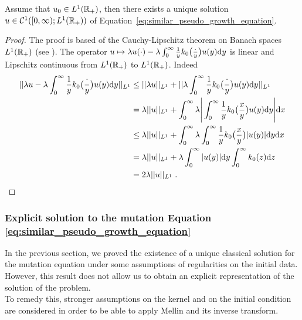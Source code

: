 \documentclass[11pt]{amsart}
\begin{document}
\begin{lemma} Assume that $u_0 \in L^1(\mathbb{R}_+)$, then there exists a unique solution $u \in \mathcal{C}^1([0, \infty); L^1(\mathbb{R}_+))$ of Equation~\eqref{eq:similar_pseudo_growth_equation}.
\end{lemma}
\begin{proof}
The proof is based of the Cauchy-Lipschitz theorem on Banach spaces $L^1(\mathbb{R}_+)$ (see \cite{brezis2011functional}). The operator $u \mapsto \lambda u(\cdot) - \lambda \int_0^\infty \frac{1}{y} k_0 \big(\frac{\cdot}{y} \big) u(y) \mathrm dy$ is linear and Lipschitz continuous from $L^1(\mathbb{R}_+)$ to $L^1(\mathbb{R}_+)$. Indeed
    \begin{align*}
        || \lambda u - \lambda \int_0^\infty \frac{1}{y} k_0 \big(\frac{\cdot}{y} \big) u(y) \mathrm dy ||_{L^1}
        & \leq
        || \lambda u||_{L^1} + || \lambda \int_0^\infty \frac{1}{y} k_0 \big(\frac{\cdot}{y} \big) u(y) \mathrm dy ||_{L^1} \\
        & = 
        \lambda ||u ||_{L^1} + \int_0^\infty \lambda \Bigg| \int_0^\infty \frac{1}{y} k_0 \big(\frac{x}{y} \big) u(y) \mathrm dy \Bigg| \mathrm dx \\
        & \leq 
        \lambda ||u||_{L^1} + \int_0^\infty \lambda \int_0^\infty \frac{1}{y} k_0 \big(\frac{x}{y} \big) |u(y)| \mathrm dy  \mathrm dx \\
        &= 
        \lambda ||u||_{L^1} + \lambda \int_0^\infty |u(y)|  \mathrm dy \int_0^\infty k_0(z) \mathrm dz \\
        &= 
        2 \lambda ||u||_{L^1}
        \; .
    \end{align*}
\end{proof}

\subsubsection{Explicit solution to the mutation Equation \eqref{eq:similar_pseudo_growth_equation}}

In the previous section, we proved the existence of a unique classical solution for the mutation equation under some assumptions of regularities on the initial data. However, this result does not allow us to obtain an explicit representation of the solution of the problem. \\

To remedy this, stronger assumptions on the kernel and on the initial condition are considered in order to be able to apply Mellin and its inverse transform. \\
\end{document}
